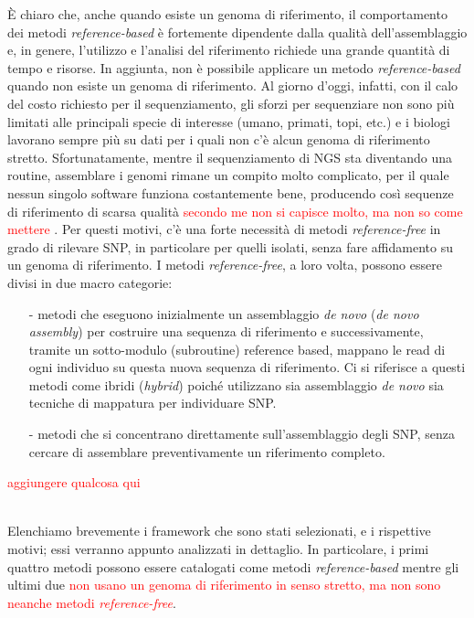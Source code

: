 \documentclass[../main.tex]{subfiles}
\begin{document}
È chiaro che, anche quando esiste un genoma di riferimento, il comportamento dei metodi \textit{reference-based} è fortemente dipendente dalla qualità dell'assemblaggio e, in genere, l'utilizzo e l'analisi del riferimento richiede una grande quantità di tempo e risorse. In aggiunta, non è possibile applicare un metodo \textit{reference-based} quando non esiste un genoma di riferimento. Al giorno d'oggi, infatti, con il calo del costo richiesto per il sequenziamento, gli sforzi per sequenziare non sono più limitati alle principali specie di interesse (umano, primati, topi, etc.) e i biologi lavorano sempre più su dati per i quali non c'è alcun genoma di riferimento stretto. Sfortunatamente, mentre il sequenziamento di NGS sta diventando una routine, assemblare i genomi rimane un compito molto complicato, per il quale nessun singolo software funziona costantemente bene, producendo così sequenze di riferimento di scarsa qualità \textcolor{red}{secondo me non si capisce molto, ma non so come mettere} . Per questi motivi, c'è una forte necessità di metodi \textit{reference-free} in grado di rilevare SNP, in particolare per quelli isolati, senza fare affidamento su un genoma di riferimento. I metodi \textit{reference-free}, a loro volta, possono essere divisi in due macro categorie:
\begin{itemize} 
\item[-] metodi che eseguono inizialmente un assemblaggio \textit{de novo} (\textit{de novo assembly}) per costruire una sequenza di riferimento e successivamente, tramite un sotto-modulo (subroutine) reference based, mappano le read di ogni individuo su questa nuova sequenza di riferimento. Ci si riferisce a questi metodi come ibridi (\textit{hybrid}) poiché utilizzano sia assemblaggio \textit{de novo} sia tecniche di mappatura per individuare SNP.
\item[-] metodi che si concentrano direttamente sull'assemblaggio degli SNP, senza cercare di assemblare preventivamente un riferimento completo.
\end{itemize}

 \textcolor{red}{aggiungere qualcosa qui}

\noindent
\\Elenchiamo brevemente i framework che sono stati selezionati, e i rispettive motivi; essi verranno appunto analizzati in dettaglio. In particolare, i primi quattro metodi possono essere catalogati come metodi \textit{reference-based} mentre gli ultimi due \textcolor{red}{non usano un genoma di riferimento in senso stretto, ma non sono neanche metodi \textit{reference-free}}.
\end{document}
